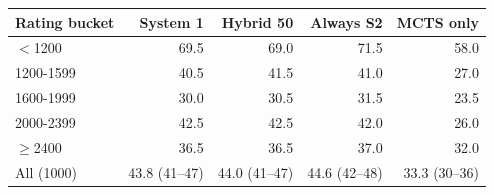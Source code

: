 \footnotesize\setlength{\tabcolsep}{3pt}\begin{tabular}{lrrrr}
\toprule
Rating bucket & System 1 & Hybrid 50 & Always S2 & MCTS only \\
\midrule
$<$1200 & 69.5 & 69.0 & 71.5 & 58.0 \\
1200-1599 & 40.5 & 41.5 & 41.0 & 27.0 \\
1600-1999 & 30.0 & 30.5 & 31.5 & 23.5 \\
2000-2399 & 42.5 & 42.5 & 42.0 & 26.0 \\
$\ge$2400 & 36.5 & 36.5 & 37.0 & 32.0 \\
\midrule
All (1000) & 43.8 (41--47) & 44.0 (41--47) & 44.6 (42--48) & 33.3 (30--36) \\
\bottomrule
\end{tabular}
